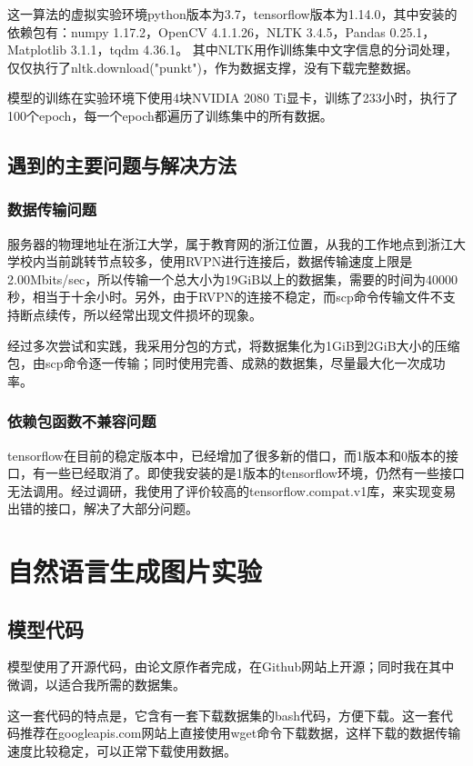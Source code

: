 这一算法的虚拟实验环境python版本为3.7，tensorflow版本为1.14.0，其中安装的依赖包有：numpy 1.17.2，OpenCV 4.1.1.26，NLTK 3.4.5，Pandas 0.25.1，Matplotlib 3.1.1，tqdm 4.36.1。
其中NLTK用作训练集中文字信息的分词处理，仅仅执行了nltk.download("punkt")，作为数据支撑，没有下载完整数据。

模型的训练在实验环境下使用4块NVIDIA 2080 Ti显卡，训练了233小时，执行了100个epoch，每一个epoch都遍历了训练集中的所有数据。

\subsection{遇到的主要问题与解决方法}
\subsubsection{数据传输问题}
服务器的物理地址在浙江大学，属于教育网的浙江位置，从我的工作地点到浙江大学校内当前跳转节点较多，使用RVPN进行连接后，数据传输速度上限是2.00Mbits/sec，所以传输一个总大小为19GiB以上的数据集，需要的时间为40000秒，相当于十余小时。另外，由于RVPN的连接不稳定，而scp命令传输文件不支持断点续传，所以经常出现文件损坏的现象。

经过多次尝试和实践，我采用分包的方式，将数据集化为1GiB到2GiB大小的压缩包，由scp命令逐一传输；同时使用完善、成熟的数据集，尽量最大化一次成功率。

\subsubsection{依赖包函数不兼容问题}
tensorflow在目前的稳定版本中，已经增加了很多新的借口，而1版本和0版本的接口，有一些已经取消了。即使我安装的是1版本的tensorflow环境，仍然有一些接口无法调用。经过调研，我使用了评价较高的tensorflow.compat.v1库，来实现变易出错的接口，解决了大部分问题。

\section{自然语言生成图片实验}
\subsection{模型代码}
模型使用了开源代码，由论文原作者完成，在Github网站上开源；同时我在其中微调，以适合我所需的数据集。

这一套代码的特点是，它含有一套下载数据集的bash代码，方便下载。这一套代码推荐在googleapis.com网站上直接使用wget命令下载数据，这样下载的数据传输速度比较稳定，可以正常下载使用数据。

